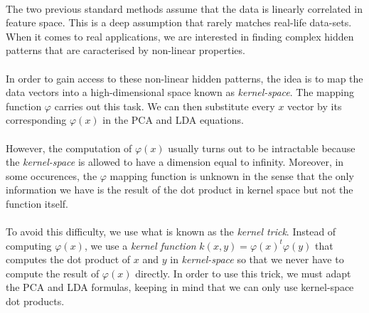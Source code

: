 \paragraph{}
The two previous standard methods assume that the data is linearly correlated in feature space. This
is a deep assumption that rarely matches real-life data-sets. When it comes to real applications, we
are interested in finding complex hidden patterns that are caracterised by non-linear properties.

\paragraph{}
In order to gain access to these non-linear hidden patterns, the idea is to map the data vectors into
a high-dimensional space known as \emph{kernel-space}. The mapping function $\varphi$ carries out
this task. We can then substitute every $x$ vector by its corresponding $\varphi(x)$ in the PCA and
LDA equations.

\paragraph{}
However, the computation of $\varphi(x)$ usually turns out to be intractable because the
\emph{kernel-space} is allowed to have a dimension equal to infinity. Moreover, in some occurences,
the $\varphi$ mapping function is unknown in the sense that the only information we have is the
result of the dot product in kernel space but not the function itself.

\paragraph{}
To avoid this difficulty, we use what is known as the \emph{kernel trick}. Instead of computing
$\varphi(x)$, we use a \emph{kernel function} $k(x, y) = \varphi(x)^t\varphi(y)$ that computes
the dot product of $x$ and $y$ in \emph{kernel-space} so that we never have to compute the result of
$\varphi(x)$ directly. In order to use this trick, we must adapt the PCA and LDA formulas, keeping in
mind that we can only use kernel-space dot products.
